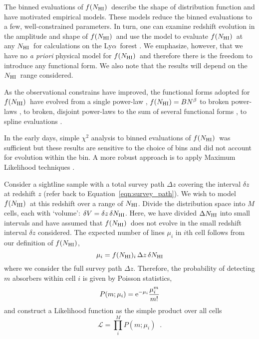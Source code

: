 \documentclass[graybox]{svmult}
\def\lya{Ly$\alpha$}
\newcommand{\mnhi}{N_{\rm HI}}
\newcommand{\nhi}{$\mnhi$}
\def\mfnhi{f(\mnhi)}
\def\fnhi{$\mfnhi$}
\def\prodl{\prod\limits}
\begin{document}
The binned evaluations of \fnhi\ describe the shape of 
distribution function and have motivated empirical
models. These models reduce the binned evaluations to a few, 
well-constrained parameters.  In turn, one can
examine redshift evolution in the amplitude and shape
of \fnhi\ and use the model to evaluate \fnhi\ at 
any \nhi\ for calculations on the \lya\ forest 
\cite[see below][]{mm93}.
We emphasize, however, that we have no {\it a priori}
physical model for \fnhi\ and therefore there is the
freedom to introduce any functional form.
We also note that the results will depend
on the \nhi\ range considered. 

As the observational constrains have improved, the
functional forms adopted for \fnhi\ have evolved from
a single power-law \cite{tytler87},
$\mfnhi = B N^\beta$
to broken power-laws \cite{petit93,pow10},
to broken, disjoint power-laws \cite{rudie13} 
to the sum of several functional forms \cite{inoue+14},
to spline evaluations \cite{pro+14}.

In the early days, simple $\chi^2$ analysis
to binned evaluations of \fnhi\
was sufficient but these results
are sensitive to the choice of bins and did
not account for evolution within the bin.
A more robust approach is to apply Maximum
Likelihood techniques \cite[][]{sim96,ctp+10}.

Consider a sightline sample with a total survey path $\Delta z$ 
covering the interval $\delta z$ at redshift $z$ (refer
back to Equation~\ref{eqn:survey_path}).
We wish to model \fnhi\ at this redshift over a
range of \nhi.  
Divide the distribution space into $M$ cells, each with 
`volume': $\delta V = \delta z \, \delta \mnhi$.
Here, we have divided $\Delta \mnhi$ into small intervals
and have assumed that \fnhi\ does not evolve in the small
redshift interval $\delta z$ considered.
The expected number of lines $\mu_i$ in $i$th cell
follows from our definition of \fnhi, 
\begin{equation}
\mu_i = f(\mnhi)_i \, \Delta z \, \delta\mnhi
\end{equation}
where we consider the full survey path $\Delta z$.
Therefore, the probability of detecting $m$ absorbers within 
cell $i$ is given by Poisson statistics,
\begin{equation}
P(m; \mu_i) = {\rm e}^{-\mu_i} \frac{\mu_i^m}{m!}
\end{equation}
and construct a Likelihood function as the 
simple product over all cells
\begin{equation}
\mathcal{L} = \prodl_i^M P(m; \mu_i) \;\; .
\end{equation}
\end{document}
